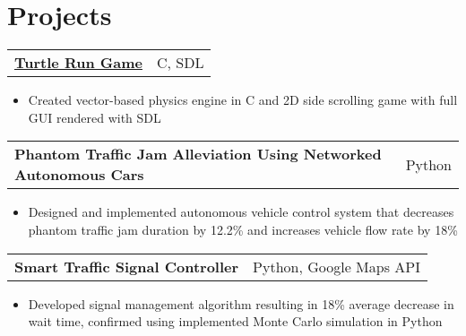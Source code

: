 \documentclass[letterpaper,11pt]{article}
\makeatletter
\newcommand{\resitem}[1]{\item[--] #1}
\newcommand{\ressubheading}[4]{
	\begin{tabular*}{7.5in}{l@{\extracolsep{\fill}}r}
			\textbf{#1} & #2 \\
			\textit{#3} & \textit{#4}
	\end{tabular*}
}
\newcommand{\projsubheading}[2]{
	\begin{tabular*}{7.5in}{l@{\extracolsep{\fill}}r}
		\textbf{#1} & #2
	\end{tabular*}
}
\makeatother
\begin{document}

\section{Projects}


\projsubheading{\href{https://github.com/derekqin8/turtle-run}{Turtle Run Game}}{C, SDL}
\begin{itemize}[leftmargin=*]
	\resitem{Created vector-based physics engine in C and 2D side scrolling game with full GUI rendered with SDL}
\end{itemize}

\projsubheading{Phantom Traffic Jam Alleviation Using Networked Autonomous Cars}{Python}
\begin{itemize}[leftmargin=*]
	\resitem{Designed and implemented autonomous vehicle control system that decreases phantom traffic jam duration by 12.2\% and increases vehicle flow rate by 18\%}
\end{itemize}

\projsubheading{Smart Traffic Signal Controller}{Python, Google Maps API}
\begin{itemize}[leftmargin=*]
	\resitem{Developed signal management algorithm resulting in 18\% average decrease in wait time, confirmed using implemented Monte Carlo simulation in Python}
\end{itemize}
\end{document}
